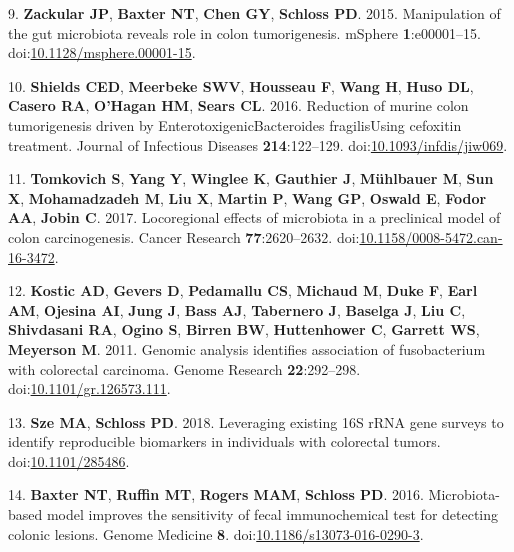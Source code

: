 \documentclass[11pt,]{article}
\begin{document}
\leavevmode\hypertarget{ref-Zackular2015}{}%
9. \textbf{Zackular JP}, \textbf{Baxter NT}, \textbf{Chen GY},
\textbf{Schloss PD}. 2015. Manipulation of the gut microbiota reveals
role in colon tumorigenesis. mSphere \textbf{1}:e00001--15.
doi:\href{https://doi.org/10.1128/msphere.00001-15}{10.1128/msphere.00001-15}.

\leavevmode\hypertarget{ref-DeStefanoShields2016}{}%
10. \textbf{Shields CED}, \textbf{Meerbeke SWV}, \textbf{Housseau F},
\textbf{Wang H}, \textbf{Huso DL}, \textbf{Casero RA}, \textbf{O'Hagan
HM}, \textbf{Sears CL}. 2016. Reduction of murine colon tumorigenesis
driven by EnterotoxigenicBacteroides fragilisUsing cefoxitin treatment.
Journal of Infectious Diseases \textbf{214}:122--129.
doi:\href{https://doi.org/10.1093/infdis/jiw069}{10.1093/infdis/jiw069}.

\leavevmode\hypertarget{ref-Tomkovich2017}{}%
11. \textbf{Tomkovich S}, \textbf{Yang Y}, \textbf{Winglee K},
\textbf{Gauthier J}, \textbf{Mühlbauer M}, \textbf{Sun X},
\textbf{Mohamadzadeh M}, \textbf{Liu X}, \textbf{Martin P}, \textbf{Wang
GP}, \textbf{Oswald E}, \textbf{Fodor AA}, \textbf{Jobin C}. 2017.
Locoregional effects of microbiota in a preclinical model of colon
carcinogenesis. Cancer Research \textbf{77}:2620--2632.
doi:\href{https://doi.org/10.1158/0008-5472.can-16-3472}{10.1158/0008-5472.can-16-3472}.

\leavevmode\hypertarget{ref-Kostic2011}{}%
12. \textbf{Kostic AD}, \textbf{Gevers D}, \textbf{Pedamallu CS},
\textbf{Michaud M}, \textbf{Duke F}, \textbf{Earl AM}, \textbf{Ojesina
AI}, \textbf{Jung J}, \textbf{Bass AJ}, \textbf{Tabernero J},
\textbf{Baselga J}, \textbf{Liu C}, \textbf{Shivdasani RA},
\textbf{Ogino S}, \textbf{Birren BW}, \textbf{Huttenhower C},
\textbf{Garrett WS}, \textbf{Meyerson M}. 2011. Genomic analysis
identifies association of fusobacterium with colorectal carcinoma.
Genome Research \textbf{22}:292--298.
doi:\href{https://doi.org/10.1101/gr.126573.111}{10.1101/gr.126573.111}.

\leavevmode\hypertarget{ref-Sze2018}{}%
13. \textbf{Sze MA}, \textbf{Schloss PD}. 2018. Leveraging existing 16S
rRNA gene surveys to identify reproducible biomarkers in individuals
with colorectal tumors.
doi:\href{https://doi.org/10.1101/285486}{10.1101/285486}.

\leavevmode\hypertarget{ref-Baxter2016}{}%
14. \textbf{Baxter NT}, \textbf{Ruffin MT}, \textbf{Rogers MAM},
\textbf{Schloss PD}. 2016. Microbiota-based model improves the
sensitivity of fecal immunochemical test for detecting colonic lesions.
Genome Medicine \textbf{8}.
doi:\href{https://doi.org/10.1186/s13073-016-0290-3}{10.1186/s13073-016-0290-3}.
\end{document}
